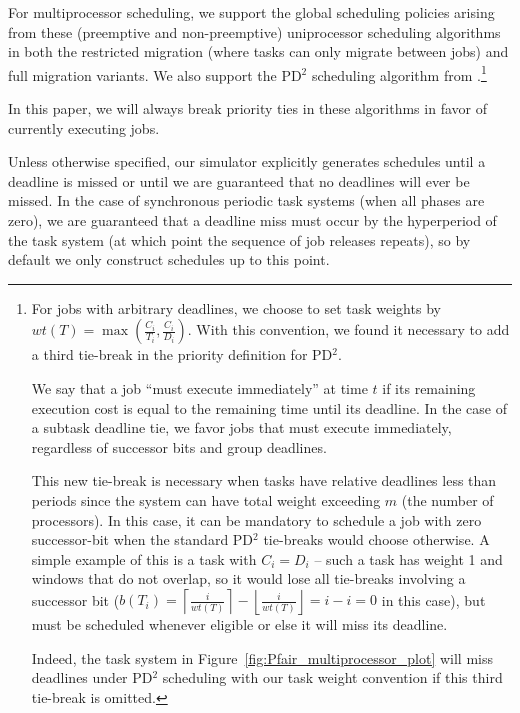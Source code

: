 \documentclass[11pt]{article}
\newcommand{\figref}[1]{Figure~\ref{#1}}
\begin{document}
For multiprocessor scheduling, we support the global scheduling policies arising from these (preemptive and non-preemptive) uniprocessor scheduling algorithms in both the restricted migration (where tasks can only migrate between jobs) and full migration variants. We also support the PD$^2$ scheduling algorithm from \cite{Srinivasan}.\footnote{For jobs with arbitrary deadlines, we choose to set task weights by $wt(T) = \max\left(\frac{C_i}{T_i}, \frac{C_i}{D_i}\right)$. With this convention, we found it necessary to add a third tie-break in the priority definition for PD$^2$.

We say that a job ``must execute immediately'' at time $t$ if its remaining execution cost is equal to the remaining time until its deadline. In the case of a subtask deadline tie, we favor jobs that must execute immediately, regardless of successor bits and group deadlines.

This new tie-break is necessary when tasks have relative deadlines less than periods since the system can have total weight exceeding $m$ (the number of processors). In this case, it can be mandatory to schedule a job with zero successor-bit when the standard PD$^2$ tie-breaks would choose otherwise. A simple example of this is a task with $C_i=D_i$ -- such a task has weight 1 and windows that do not overlap, so it would lose all tie-breaks involving a successor bit \Big($b(T_i) = \left\lceil\frac{i}{wt(T)}\right\rceil - \left\lfloor\frac{i}{wt(T)}\right\rfloor = i-i =0$ in this case\Big), but must be scheduled whenever eligible or else it will miss its deadline.

Indeed, the task system in \figref{fig:Pfair_multiprocessor_plot} will miss deadlines under PD$^2$ scheduling with our task weight convention if this third tie-break is omitted.}

In this paper, we will always break priority ties in these algorithms in favor of currently executing jobs.

Unless otherwise specified, our simulator explicitly generates schedules until a deadline is missed or until we are guaranteed that no deadlines will ever be missed. In the case of synchronous periodic task systems (when all phases are zero), we are guaranteed that a deadline miss must occur by the hyperperiod of the task system (at which point the sequence of job releases repeats), so by default we only construct schedules up to this point.
\end{document}
